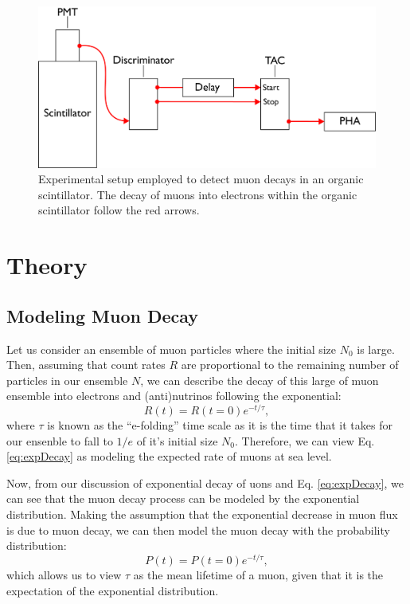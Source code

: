 \documentclass[
    aps, 
    twocolumn, 
    secnumarabic, 
    balancelastpage, 
    amsmath, 
    amssymb, 
    nofootinbib, 
    floatfix
]{revtex4-2}
\begin{document}
\begin{figure}[t]
\includegraphics[width=12cm]{figures/expSetup.png}
\caption{Experimental setup employed to detect muon decays in an organic scintillator. The decay of muons into electrons within the organic scintillator follow the red arrows.}
\label{fig:exp_setup}
\end{figure}

\section{Theory}

\subsection{Modeling Muon Decay}
\label{sec:timeModel}

Let us consider an ensemble of muon particles where the initial size $N_0$ is large. Then, assuming that count rates $R$ are proportional to the remaining number of particles in our ensemble $N$, we can describe the decay of this large of muon ensemble into electrons and (anti)nutrinos following the exponential: 
\begin{equation}
	R(t) = R(t = 0) e^{-t/\tau},
	\label{eq:expDecay}
\end{equation}
where $\tau$ is known as the ``e-folding'' time scale as it is the time that it takes for our ensenble to fall to $1/e$ of it's initial size $N_0$. Therefore, we can view Eq. \eqref{eq:expDecay} as modeling the expected rate of muons at sea level. \par 

Now, from our discussion of exponential decay of uons and Eq. \eqref{eq:expDecay}, we can see that the muon decay process can be modeled by the exponential distribution. Making the assumption that the exponential decrease in muon flux is due to muon decay, we can then model the muon decay with the probability distribution: 
\begin{equation}
	P(t) = P(t = 0)e^{-t/\tau},
\end{equation}
which allows us to view $\tau$ as the mean lifetime of a muon, given that it is the expectation of the exponential distribution. \par
\end{document}
